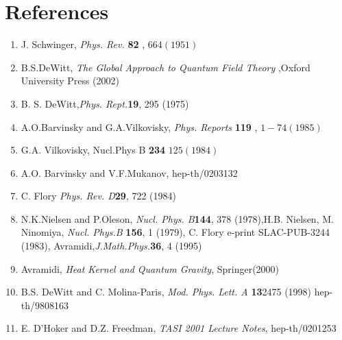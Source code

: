 \documentclass[a4paper,12 pt]{article}
\begin{document}
\section{References}
\begin{enumerate}
\item J. Schwinger, \emph{Phys. Rev. }\textbf{ 82 }, $ 664 (1951)$
\item B.S.DeWitt, \emph{The Global Approach to Quantum Field
Theory} ,Oxford University Press (2002) \item B. S.
DeWitt,\emph{Phys. Rept.}\textbf{19}, 295  (1975) \item
A.O.Barvinsky and G.A.Vilkovisky, \emph{Phys. Reports} \textbf{119
}, $  1-74 (1985)$ \item G.A. Vilkovisky, Nucl.Phys B \textbf{234}
$ 125 (1984)$
 \item A.O. Barvinsky and
V.F.Mukanov, hep-th/0203132 \item C. Flory \emph{Phys. Rev.
D}\textbf{29}, 722 (1984) \item N.K.Nielsen and P.Oleson,
\emph{Nucl. Phys. B}\textbf{144}, 378 (1978),H.B. Nielsen, M.
Ninomiya, \emph{Nucl. Phys.B} \textbf{156}, 1 (1979), C. Flory
e-print SLAC-PUB-3244 (1983),
Avramidi,\emph{J.Math.Phys.}\textbf{36}, 4 (1995) \item
 Avramidi,
\emph{Heat Kernel and Quantum Gravity}, Springer(2000)
 \item B.S.
DeWitt and C. Molina-Paris, \emph{Mod. Phys. Lett. A}
\textbf{13}2475 (1998) hep-th/9808163
 \item E. D'Hoker and D.Z. Freedman, \emph{TASI 2001 Lecture Notes}, hep-th/0201253
\end{enumerate}
\end{document}
